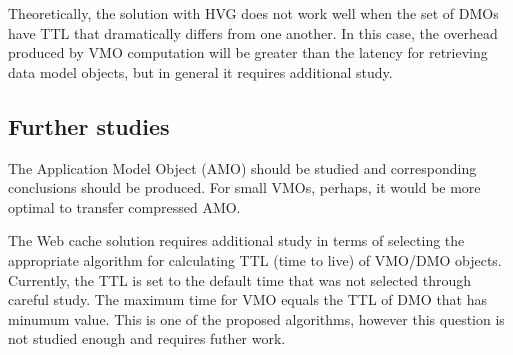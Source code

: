 Theoretically, the solution with HVG does not work well when the set of DMOs have TTL that dramatically differs from one another. In this case, the overhead produced by VMO computation will be greater than the latency for retrieving data model objects, but in general it requires additional study. 

\subsection{Further studies}

The Application Model Object (AMO) should be studied and corresponding conclusions should be produced. For small VMOs, perhaps, it would be more optimal to transfer compressed AMO.

The Web cache solution requires additional study in terms of selecting the appropriate algorithm for calculating TTL (time to live) of VMO/DMO objects. Currently, the TTL is set to the default time that was not selected through careful study. The maximum time for VMO equals the TTL of DMO that has minumum value. This is one of the proposed algorithms, however this question is not studied enough and requires futher work.

\newpage
